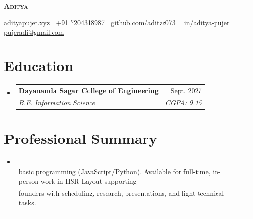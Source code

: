 \documentclass[letterpaper,11pt]{article}
\makeatletter
\newcommand{\resumeSubheading}[4]{
  \vspace{-2pt}\item
    \begin{tabular*}{0.97\textwidth}[t]{l@{\extracolsep{\fill}}r}
      \textbf{#1} & #2 \\
      \textit{\small#3} & \textit{\small #4} \\
    \end{tabular*}\vspace{-7pt}
}
\newcommand{\resumeSubHeadingListStart}{\begin{itemize}[leftmargin=0.15in, label={}]}
\newcommand{\resumeSubHeadingListEnd}{\end{itemize}}
\makeatother
\begin{document}
\begin{flushright}
  \color{gray}
  \item
\end{flushright}

\vspace{-16.5pt}

\begin{center}
    \textbf{\Huge \scshape Aditya} \\ \vspace{8pt}
    \small 
                      
    \href{https://www.adityapujer.xyz}
    {\underline{adityapujer.xyz}}
    $ | $
    \href{tel:+917204328987}
    {\underline{+91 7204318987}}
    $ | $
    \href{https://github.com/aditzz073}{\underline{github.com/aditzz073}} $  $
    $ | $
    \href{https://linkedin.com/in/aditya-pujer}{\underline{in/aditya-pujer}} $  $
    $ | $
    \href{mailto:pujeradi@gmail.com}
    {\underline{pujeradi@gmail.com}}
    
\end{center}

\section{Education}
  \resumeSubHeadingListStart
  
    \resumeSubheading
      {Dayananda Sagar College of Engineering}{Sept. 2027}
      {B.E. Information Science}{CGPA: 9.15}
  \resumeSubHeadingListEnd

\section{Professional Summary}
\resumeSubHeadingListStart
  \resumeSubheading
    {\normalfont Proactive undergraduate with startup founder experience. Skilled in research, operations, client relations, and\\
      basic programming (JavaScript/Python). Available for full-time, in-person work in HSR Layout supporting\\
      founders with scheduling, research, presentations, and light technical tasks.\\}{}{}{}

\resumeSubHeadingListEnd
\vspace{-1.6em}
\end{document}
